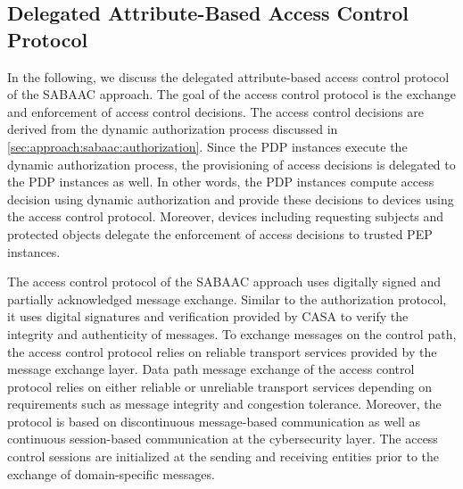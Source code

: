 \subsection{Delegated Attribute-Based Access Control Protocol}
\label{sec:approach:sabaac:accesscontrol}
In the following, we discuss the delegated attribute-based access control protocol of the SABAAC approach.
The goal of the access control protocol is the exchange and enforcement of access control decisions.
The access control decisions are derived from the dynamic authorization process discussed in \autoref{sec:approach:sabaac:authorization}.
Since the PDP instances execute the dynamic authorization process, the provisioning of access decisions is delegated to the PDP instances as well.
In other words, the PDP instances compute access decision using dynamic authorization and provide these decisions to devices using the access control protocol.
Moreover, devices including requesting subjects and protected objects delegate the enforcement of access decisions to trusted PEP instances.

The access control protocol of the SABAAC approach uses digitally signed and partially acknowledged message exchange.
Similar to the authorization protocol, it uses digital signatures and verification provided by CASA to verify the integrity and authenticity of messages.
To exchange messages on the control path, the access control protocol relies on reliable transport services provided by the message exchange layer.
Data path message exchange of the access control protocol relies on either reliable or unreliable transport services depending on requirements such as message integrity and congestion tolerance.
Moreover, the protocol is based on discontinuous message-based communication as well as continuous session-based communication at the cybersecurity layer.
The access control sessions are initialized at the sending and receiving entities prior to the exchange of domain-specific messages.

